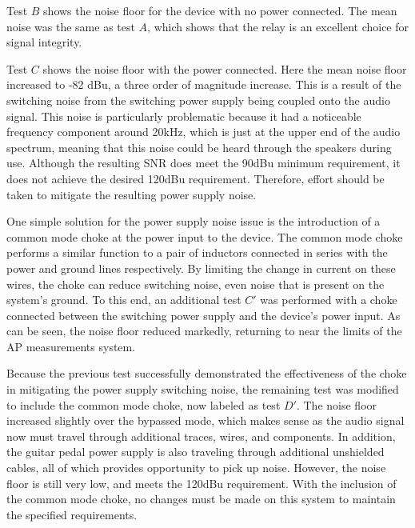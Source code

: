 \documentclass{article}
\begin{document}
	Test $B$ shows the noise floor for the device with no power connected.  The mean noise was the same as test $A$, which shows that the relay is an excellent choice for signal integrity.

	Test $C$ shows the noise floor with the power connected.  Here the mean noise floor increased to -82 dBu, a three order of magnitude increase.  This is a result of the switching noise from the switching power supply being coupled onto the audio signal.  This noise is particularly problematic because it had a noticeable frequency component around 20kHz, which is just at the upper end of the audio spectrum, meaning that this noise could be heard through the speakers during use.  Although the resulting SNR does meet the 90dBu minimum requirement, it does not achieve the desired 120dBu requirement.  Therefore, effort should be taken to mitigate the resulting power supply noise.

	One simple solution for the power supply noise issue is the introduction of a common mode choke at the power input to the device.  The common mode choke performs a similar function to a pair of inductors connected in series with the power and ground lines respectively.  By limiting the change in current on these wires, the choke can reduce switching noise, even noise that is present on the system's ground.  To this end, an additional test $C'$ was performed with a choke connected between the switching power supply and the device's power input.  As can be seen, the noise floor reduced markedly, returning to near the limits of the AP measurements system.  

	Because the previous test successfully demonstrated the effectiveness of the choke in mitigating the power supply switching noise, the remaining test was modified to include the common mode choke, now labeled as test $D'$. The noise floor increased slightly over the bypassed mode, which makes sense as the audio signal now must travel through additional traces, wires, and components.  In addition, the guitar pedal power supply is also traveling through additional unshielded cables, all of which provides opportunity to pick up noise.  However, the noise floor is still very low, and meets the 120dBu requirement.  With the inclusion of the common mode choke, no changes must be made on this system to maintain the specified requirements.
\end{document}
